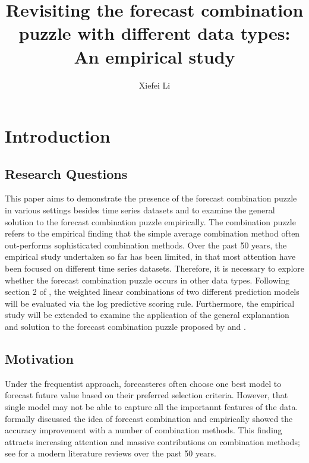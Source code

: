\documentclass{monashthesis}
\author{Xiefei Li}
\title{Revisiting the forecast combination puzzle with different data types: An empirical study}
\begin{document}

\titlepage

{\sf\tighttoc\doublespacing}

\clearpage{}\setcounter{page}{0}

\hypertarget{ch:intro}{%
\chapter{Introduction}\label{ch:intro}}

\hypertarget{research-questions}{%
\section{Research Questions}\label{research-questions}}

This paper aims to demonstrate the presence of the forecast combination puzzle in various settings besides time series datasets and to examine the general solution to the forecast combination puzzle empirically. The combination puzzle refers to the empirical finding that the simple average combination method often out-performs sophisticated combination methods. Over the past 50 years, the empirical study undertaken so far has been limited, in that most attention have been focused on different time series datasets. Therefore, it is necessary to explore whether the forecast combination puzzle occurs in other data types. Following section 2 of \textcite{GA11}, the weighted linear combinations of two different prediction models will be evaluated via the log predictive scoring rule. Furthermore, the empirical study will be extended to examine the application of the general explanantion and solution to the forecast combination puzzle proposed by \textcite{ZMFP22} and \textcite{FZMP23}.

\hypertarget{motivation}{%
\section{Motivation}\label{motivation}}

Under the frequentist approach, forecasteres often choose one best model to forecast future value based on their preferred selection criteria. However, that single model may not be able to capture all the importannt features of the data. \textcite{BG69} formally discussed the idea of forecast combination and empirically showed the accuracy improvement with a number of combination methods. This finding attracts increasing attention and massive contributions on combination methods; see \textcite{WHLK22} for a modern literature reviews over the past 50 years.
\end{document}
